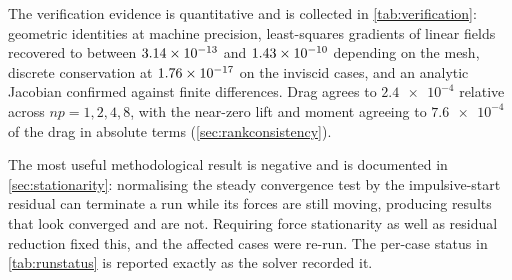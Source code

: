 The verification evidence is quantitative and is collected in
\cref{tab:verification}: geometric identities at machine precision, least-squares
gradients of linear fields recovered to between $\num{3.14e-13}$ and
$\num{1.43e-10}$ depending on the mesh, discrete conservation at
$\num{1.76e-17}$ on the inviscid cases, and an analytic Jacobian confirmed
against finite differences. Drag agrees to $\num{2.4e-4}$ relative across $np=1,2,4,8$,
with the near-zero lift and moment agreeing to $\num{7.6e-4}$ of the drag in absolute
terms (\cref{sec:rankconsistency}).

The most useful methodological result is negative and is documented in
\cref{sec:stationarity}: normalising the steady convergence test by the
impulsive-start residual can terminate a run while its forces are still moving,
producing results that look converged and are not. Requiring force stationarity as
well as residual reduction fixed this, and the affected cases were re-run. The
per-case status in \cref{tab:runstatus} is reported exactly as the solver recorded
it.
